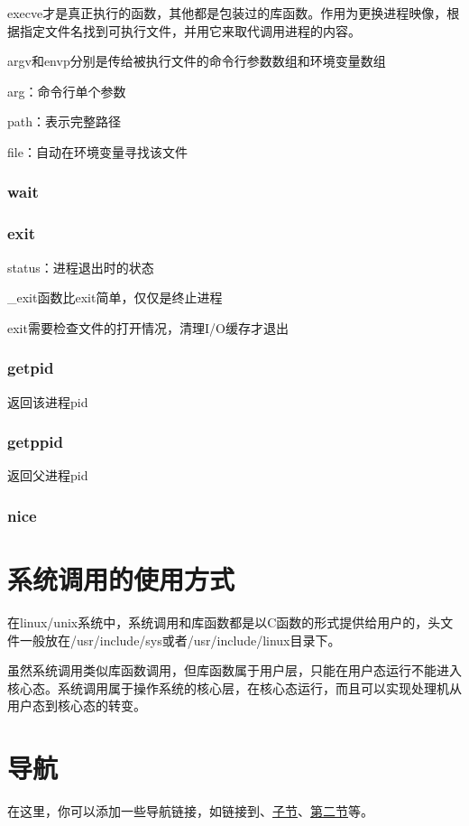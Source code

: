 \documentclass{ctexart}
\begin{document}
execve才是真正执行的函数，其他都是包装过的库函数。作用为更换进程映像，根据指定文件名找到可执行文件，并用它来取代调用进程的内容。

argv和envp分别是传给被执行文件的命令行参数数组和环境变量数组

arg：命令行单个参数

path：表示完整路径

file：自动在环境变量寻找该文件

\subsubsection{wait}
\subsubsection{exit}
status：进程退出时的状态

\_exit函数比exit简单，仅仅是终止进程

exit需要检查文件的打开情况，清理I/O缓存才退出
\subsubsection{getpid}
返回该进程pid
\subsubsection{getppid}
返回父进程pid
\subsubsection{nice}

\section{系统调用的使用方式}
在linux/unix系统中，系统调用和库函数都是以C函数的形式提供给用户的，头文件一般放在/usr/include/sys或者/usr/include/linux目录下。

虽然系统调用类似库函数调用，但库函数属于用户层，只能在用户态运行不能进入核心态。系统调用属于操作系统的核心层，在核心态运行，而且可以实现处理机从用户态到核心态的转变。

\subsection{}


\clearpage

\section*{导航}
\label{sec:navigation}

在这里，你可以添加一些导航链接，如链接到、\hyperref[subsec:sub]{子节}、\hyperref[sec:second]{第二节}等。
\end{document}
